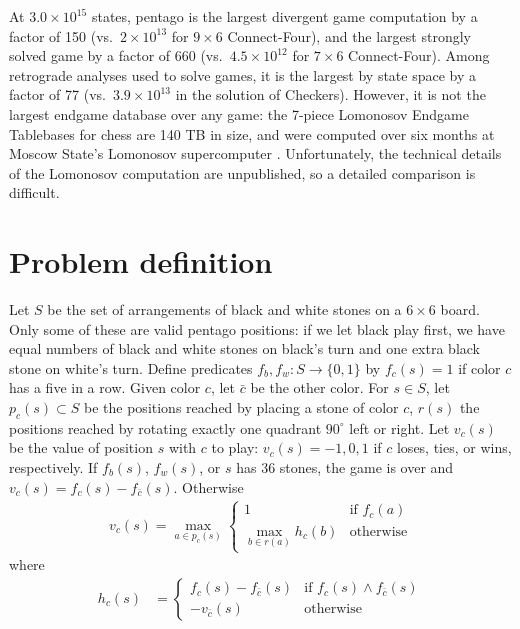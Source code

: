 \documentclass[conference]{IEEEtran}
\begin{document}
At $3.0 \times 10^{15}$ states, pentago is the largest divergent game computation by a factor of
150 (vs.\ $2 \times 10^{13}$ for $9 \times 6$ Connect-Four), and the largest strongly solved game by a factor of
660 (vs.\ $4.5 \times 10^{12}$ for $7 \times 6$ Connect-Four).  Among retrograde analyses used to solve games,
it is the largest by state space by a factor of 77 (vs.\ $3.9 \times 10^{13}$ in the solution of Checkers).
However, it is not the largest endgame database over any game: the 7-piece Lomonosov Endgame Tablebases for
chess are 140 TB in size, and were computed over six months at Moscow State's Lomonosov supercomputer
\cite{makhnychev2012chess}.  Unfortunately, the technical details of the Lomonosov computation are unpublished,
so a detailed comparison is difficult.

\section{Problem definition}

Let $S$ be the set of arrangements of black and white stones on a $6 \times 6$ board.  Only some of these are
valid pentago positions: if we let black play first, we have equal numbers of black and white stones on black's
turn and one extra black stone on white's turn.  Define predicates $f_b,f_w : S \to \{0,1\}$ by $f_c(s) = 1$
if color $c$ has a five in a row.  Given color $c$, let $\bar{c}$ be the other color.  For $s \in S$, let
$p_c(s) \subset S$ be the positions reached by placing a stone of color $c$, $r(s)$ the positions reached by
rotating exactly one quadrant $90^\circ$ left or right.  Let $v_c(s)$ be the value of position $s$ with $c$
to play: $v_c(s) = -1,0,1$ if $c$ loses, ties, or wins, respectively.  If $f_b(s)$, $f_w(s)$, or $s$ has 36 stones,
the game is over and $v_c(s) = f_c(s) - f_{\bar{c}}(s)$.  Otherwise
\begin{align*}
v_c(s) = \max_{a \in p_c(s)} \begin{cases}
  1 & \mbox{if } f_c(a) \\
  \max_{b \in r(a)} h_c(b) & \mbox{otherwise}
\end{cases}
\end{align*}
where
\begin{align*}
h_c(s) &= \begin{cases} f_c(s) - f_{\bar{c}}(s) & \mbox{if } f_c(s) \wedge f_{\bar{c}}(s) \\
                        -v_{\bar{c}}(s) & \mbox{otherwise} \end{cases}
\end{align*}
\end{document}
